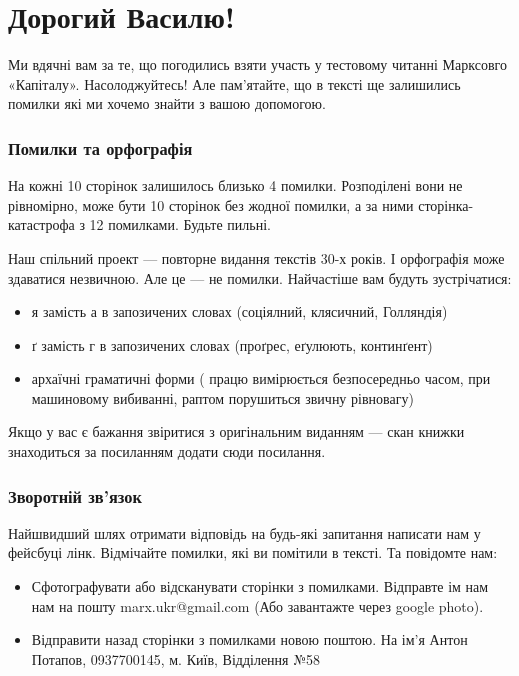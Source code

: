 \documentclass{kapital}
\begin{document}
\section*{Дорогий Василю!}

Ми вдячні вам за те, що погодились взяти участь у тестовому читанні Марксовго «Капіталу».
Насолоджуйтесь! Але пам'ятайте, що в тексті ще залишились помилки які ми хочемо знайти з вашою допомогою.

\subsubsection*{Помилки та орфографія}

На кожні 10 сторінок залишилось близько 4 помилки. Розподілені вони не рівномірно, може бути 10 сторінок без жодної помилки, а за ними сторінка-катастрофа з 12 помилками. Будьте пильні.

Наш спільний проект — повторне видання текстів 30-х років. І орфографія може здаватися незвичною. Але це — не помилки. Найчастіше вам будуть зустрічатися:
\begin{itemize}
\item я замість а в запозичених словах (соціялний, клясичний, Голляндія)
\item ґ замість г в запозичених словах (проґрес, еґулюють, континґент)
\item архаїчні граматичні форми ( працю вимірюється безпосередньо часом, при машиновому вибиванні, раптом порушиться звичну рівновагу)
\end{itemize}

\noindent{}Якщо у вас є бажання звіритися з оригінальним виданням — скан книжки знаходиться за посиланням додати сюди посилання.

\subsubsection*{Зворотній зв'язок}

Найшвидший шлях отримати відповідь на будь-які запитання написати нам у фейсбуці лінк. Відмічайте помилки, які ви помітили в тексті. Та повідомте нам:

\begin{itemize}
\item Сфотографувати або відсканувати сторінки з помилками. Відправте ім нам нам на пошту marx.ukr@gmail.com (Або завантажте через google photo).
\item Відправити назад сторінки з помилками новою поштою. На ім’я Антон Потапов, 0937700145, м. Київ, Відділення №58
\end{itemize}
\end{document}
